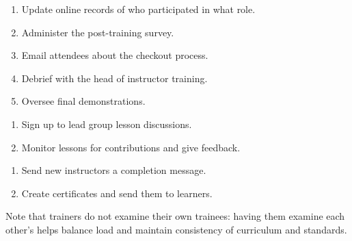 
\begin{enumerate}

\item
  Update online records of who participated in what role.

\item
  Administer the post-training survey.

\item
  Email attendees about the checkout process.

\item
  Debrief with the head of instructor training.

\item
  Oversee final demonstrations.

\end{enumerate}


\begin{enumerate}

\item
  Sign up to lead group lesson discussions.

\item
  Monitor lessons for contributions and give feedback.

\end{enumerate}


\begin{enumerate}

\item
  Send new instructors a completion message.

\item
  Create certificates and send them to learners.

\end{enumerate}

Note that trainers do not examine their own trainees: having them
examine each other's helps balance load and maintain consistency of
curriculum and standards.
